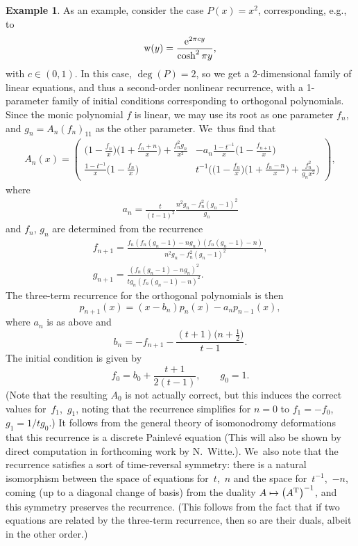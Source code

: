 \documentclass[pdftex]{sigma}
\theoremstyle{definition}
\newtheorem{Example}[Theorem]{Example}
\numberwithin{equation}{section}
\begin{document}
\begin{Example}
As an example, consider the case $P(x)=x^2$, corresponding, e.g., to
\[
{\rm w}(y)=\frac{{\rm e}^{2\pi cy}}{\cosh^2\pi y},
\]
with $c\in (0,1)$. In this case,
$\deg(P)=2$, so we get a $2$-dimensional family of linear equations, and
thus a second-order nonlinear recurrence, with a 1-parameter family of
initial conditions corresponding to orthogonal polynomials. Since the
monic polynomial $f$ is linear, we may use its root as one parameter $f_n$,
and $g_n=A_n(f_n)_{11}$ as the other parameter. We~thus find that
\begin{gather}
A_n(x)=
\begin{pmatrix}
\big(1-\frac{f_n}{x}\big)\big(1+\frac{f_n+n}{x}\big)+\frac{f_n^2 g_n}{x^2}
&-a_n\frac{1-t^{-1}}{x}\big(1-\frac{f_{n+1}}{x}\big)
\\
\frac{1-t^{-1}}{x}\big(1-\frac{f_n}{x}\big)
&t^{-1}\big(\big(1-\frac{f_n}{x}\big)\big(1+\frac{f_n-n}{x}\big)+\frac{f_n^2}{g_n x^2}\big)
\end{pmatrix} ,
\end{gather}
where
\begin{gather}
a_n = \frac{t}{(t-1)^2}\frac{n^2g_n-f_n^2(g_n-1)^2}{g_n}
\end{gather}
and $f_n$, $g_n$ are determined from the recurrence
\begin{gather}
f_{n+1} =\frac{f_n(f_n(g_n-1)-ng_n)(f_n(g_n-1)-n)}{n^2g_n-f_n^2(g_n-1)^2},
\\
g_{n+1} = \frac{(f_n(g_n-1)-ng_n)^2}{t g_n (f_n(g_n-1)-n)^2}.
\end{gather}
The three-term recurrence for the orthogonal polynomials is then
\[
p_{n+1}(x)=(x-b_n)p_n(x)-a_np_{n-1}(x),
\]
where $a_n$ is as above and
\[
b_n = -f_{n+1}-\frac{(t+1)\big(n+\frac{1}{2}\big)}{t-1}.
\]
The initial condition is given by
\[
f_0 = b_0 + \frac{t+1}{2(t-1)},\qquad
g_0 = 1.
\]
(Note that the resulting $A_0$ is not actually correct, but this induces
the correct values for~$f_1$,~$g_1$, noting that the recurrence simplifies
for $n=0$ to $f_1=-f_0$, $g_1=1/tg_0$.) It follows from the general theory
of isomonodromy deformations~\cite{Ra} that this recurrence is a discrete
Painlev\'e equation (This will also be shown by direct computation in forthcoming work by N.~Witte.). We~also note that the recurrence satisfies a sort of
time-reversal symmetry: there is a natural isomorphism between the space of
equations for~$t$,~$n$ and the space for~$t^{-1}$,~$-n$, coming (up to a diagonal
change of basis) from the duality $A\mapsto \big(A^{\rm T}\big)^{-1}$, and this symmetry
preserves the recurrence. (This follows from the fact that if two
equations are related by the three-term recurrence, then so are their
duals, albeit in the other order.)
\end{Example}
\end{document}

